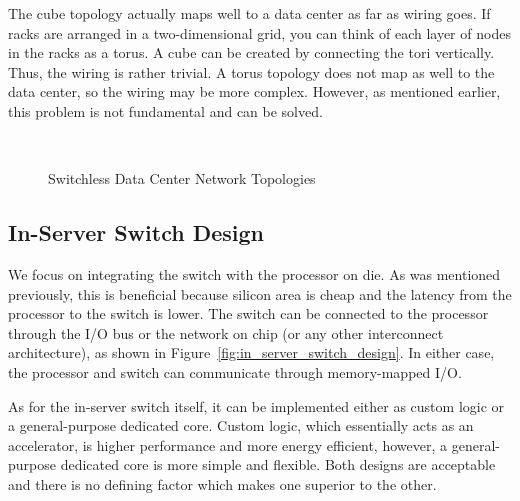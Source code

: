 The cube topology actually maps well to a data center as far as wiring goes.  If racks are arranged in a two-dimensional grid, you can think of each layer of nodes in the racks as a torus.  A cube can be created by connecting the tori vertically.  Thus, the wiring is rather trivial.  A torus topology does not map as well to the data center, so the wiring may be more complex.  However, as mentioned earlier, this problem is not fundamental and can be solved.

\begin{figure}
    \centering
    \\
    \vspace{-0.05in}
    \vspace{-0.07in}
    \caption{Switchless Data Center Network Topologies}
    \label{fig:switchless_topos}
\end{figure}

\subsection{In-Server Switch Design}

We focus on integrating the switch with the processor on die.  As was mentioned previously, this is beneficial because silicon area is cheap and the latency from the processor to the switch is lower.  The switch can be connected to the processor through the I/O bus or the network on chip (or any other interconnect architecture), as shown in Figure~\ref{fig:in_server_switch_design}.  In either case, the processor and switch can communicate through memory-mapped I/O.  

As for the in-server switch itself, it can be implemented either as custom logic or a general-purpose dedicated core.  Custom logic, which essentially acts as an accelerator, is higher performance and more energy efficient, however, a general-purpose dedicated core is more simple and flexible.  
Both designs are acceptable and there is no defining factor which makes one superior to the other.

